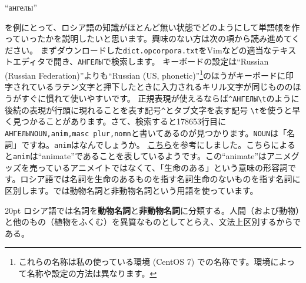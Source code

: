 \documentclass[12pt]{ltjsarticle}
\begin{document}
\begin{russian}“ангелы”\end{russian}を例にとって、ロシア語の知識がほとんど無い状態でどのようにして単語帳を作っていったかを説明したいと思います。興味のない方は次の項から読み進めてください。
まずダウンロードした\texttt{dict.opcorpora.txt}をVimなどの適当なテキストエディタで開き、\texttt{АНГЕЛЫ}で検索します。
キーボードの設定は“Russian (Russian Federation)”よりも“Russian (US, phonetic)”\footnote{これらの名称は私の使っている環境 (CentOS 7) での名称です。環境によって名称や設定の方法は異なります。}のほうがキーボードに印字されているラテン文字と押下したときに入力されるキリル文字が同じもののほうがすぐに慣れて使いやすいです。
正規表現が使えるならば\texttt{\^}\texttt{АНГЕЛЫ\textbackslash{}t}のように 後続の表現が行頭に現れることを表す記号\texttt{\^}とタブ文字を表す記号 \texttt{\textbackslash{}t}を使うと早く見つかることがあります。さて、検索すると178653行目に\texttt{АНГЕЛЫNOUN,anim,masc plur,nomn}と書いてあるのが見つかります。\texttt{NOUN}は「名詞」ですね。\texttt{anim}はなんでしょうか。
\href{http://www.ruscorpora.ru/en/corpora-morph.html}{こちら}を参考にしました。こちらによると\texttt{anim}は“animate”であることを表しているようです。この“animate”はアニメグッズを売っているアニメイトではなくて、「生命のある」という意味の形容詞です。ロシア語では名詞を生命のあるものを指す名詞生命のないものを指す名詞に区別します。\citep{uda2009}では動物名詞と非動物名詞という用語を使っています。

\bigskip

\begin{indentation}{2\zw}{0pt}
\noindent ロシア語では名詞を\textbf{動物名詞}と\textbf{非動物名詞}に分類する。人間（および動物）と他のもの（植物をふくむ）を異質なものとしてとらえ、文法上区別するからである。
\end{indentation}

\bigskip
\end{document}
